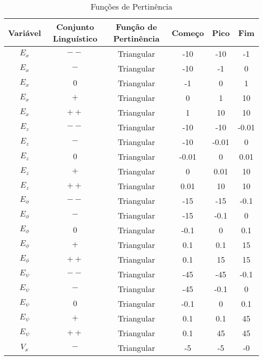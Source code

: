 \vspace{-0.5cm}
\begin{center}
    \begin{longtable}{|c|c|c|c|c|c|} %
        \caption{Funções de Pertinência} \vspace{-0.7cm}
        \label{tab:func_pert}
        \hline
        Variável & Conjunto Linguístico & Função de Pertinência & Começo & Pico & Fim \\
        \hline
        \endfirsthead
        \endhead

        $E_x$ & $--$ & Triangular & -10 & -10 & -1 \\
        $E_x$ & $-$  & Triangular & -10 & -1 & 0 \\
        $E_x$ & $0$  & Triangular & -1 & 0 & 1 \\
        $E_x$ & $+$  & Triangular & 0 & 1 & 10 \\
        $E_x$ & $++$ & Triangular & 1 & 10 & 10 \\
        \hline
        $E_{z}$ & $--$ & Triangular & -10 & -10 & -0.01 \\
        $E_{z}$ & $-$  & Triangular & -10 & -0.01 & 0 \\
        $E_{z}$ & $0$  & Triangular & -0.01 & 0 & 0.01 \\
        $E_{z}$ & $+$  & Triangular & 0 & 0.01 & 10 \\
        $E_{z}$ & $++$ & Triangular & 0.01 & 10 & 10 \\
        \hline
        $E_{\phi}$ & $--$ & Triangular & -15 & -15 & -0.1 \\
        $E_{\phi}$ & $-$  & Triangular & -15 & -0.1 & 0 \\
        $E_{\phi}$ & $0$  & Triangular & -0.1 & 0 & 0.1 \\
        $E_{\phi}$ & $+$  & Triangular & 0.1 & 0.1 & 15 \\
        $E_{\phi}$ & $++$ & Triangular & 0.1 & 15 & 15 \\
        \hline
        $E_{\psi}$ & $--$ & Triangular & -45 & -45 & -0.1 \\
        $E_{\psi}$ & $-$  & Triangular & -45 & -0.1 & 0 \\
        $E_{\psi}$ & $0$  & Triangular & -0.1 & 0 & 0.1 \\
        $E_{\psi}$ & $+$  & Triangular & 0.1 & 0.1 & 45 \\
        $E_{\psi}$ & $++$ & Triangular & 0.1 & 45 & 45 \\
        \hline
        $V_x$ & $-$ & Triangular & -5 & -5 & -0 \\

\end{longtable}
\end{center}
